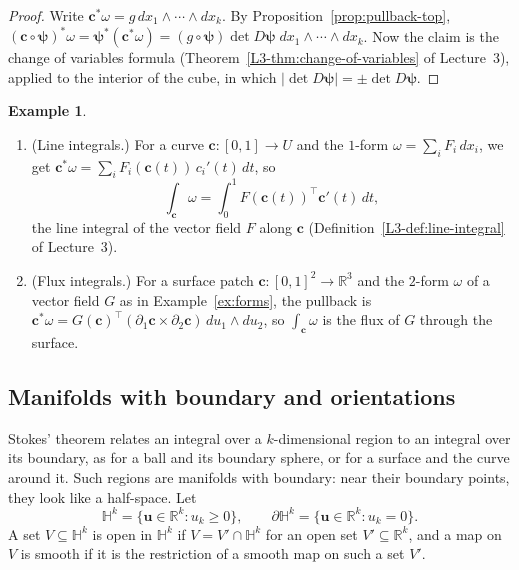 \documentclass[11pt]{article}
\theoremstyle{definition}
\newtheorem{example}[definition]{Example}
\theoremstyle{plain}
\theoremstyle{remark}
\begin{document}
\begin{proof}
    Write $\mathbf{c}^*\omega = g\, dx_1 \wedge \cdots \wedge dx_k$. By Proposition~\ref{prop:pullback-top}, $(\mathbf{c} \circ \boldsymbol{\psi})^*\omega = \boldsymbol{\psi}^*(\mathbf{c}^*\omega) = (g \circ \boldsymbol{\psi})\det D\boldsymbol{\psi}\; dx_1 \wedge \cdots \wedge dx_k$. Now the claim is the change of variables formula (Theorem~\ref{L3-thm:change-of-variables} of Lecture~3), applied to the interior of the cube, in which $|\det D\boldsymbol{\psi}| = \pm\det D\boldsymbol{\psi}$.
\end{proof}

\begin{example}\label{ex:form-integrals}
    \begin{enumerate}
        \item (Line integrals.) For a curve $\mathbf{c}: [0, 1] \to U$ and the $1$-form $\omega = \sum_i F_i\, dx_i$, we get $\mathbf{c}^*\omega = \sum_i F_i(\mathbf{c}(t))\, c_i'(t)\, dt$, so
        \[\int_{\mathbf{c}} \omega = \int_0^1 F(\mathbf{c}(t))^\top\mathbf{c}'(t)\, dt,\]
        the line integral of the vector field $F$ along $\mathbf{c}$ (Definition~\ref{L3-def:line-integral} of Lecture~3).
        \item (Flux integrals.) For a surface patch $\mathbf{c}: [0, 1]^2 \to \mathbb{R}^3$ and the $2$-form $\omega$ of a vector field $G$ as in Example~\ref{ex:forms}, the pullback is $\mathbf{c}^*\omega = G(\mathbf{c})^\top(\partial_1\mathbf{c} \times \partial_2\mathbf{c})\, du_1 \wedge du_2$, so $\int_{\mathbf{c}} \omega$ is the flux of $G$ through the surface.
    \end{enumerate}
\end{example}

\subsection{Manifolds with boundary and orientations}

Stokes' theorem relates an integral over a $k$-dimensional region to an integral over its boundary, as for a ball and its boundary sphere, or for a surface and the curve around it. Such regions are manifolds with boundary: near their boundary points, they look like a half-space. Let
\[\mathbb{H}^k = \{\mathbf{u} \in \mathbb{R}^k : u_k \geq 0\}, \qquad \partial\mathbb{H}^k = \{\mathbf{u} \in \mathbb{R}^k : u_k = 0\}.\]
A set $V \subseteq \mathbb{H}^k$ is open in $\mathbb{H}^k$ if $V = V' \cap \mathbb{H}^k$ for an open set $V' \subseteq \mathbb{R}^k$, and a map on $V$ is smooth if it is the restriction of a smooth map on such a set $V'$.
\end{document}

